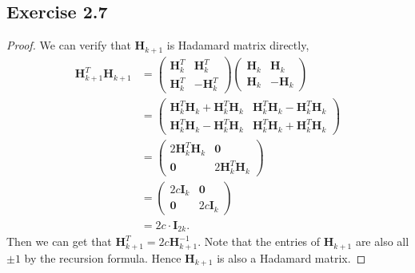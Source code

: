 \documentclass{article}
\begin{document}
\subsection{Exercise 2.7}
    \begin{proof}
    We can verify that $\bm{H}_{k+1}$ is Hadamard matrix directly,
    $$
    \begin{aligned}
    \bm{H}_{k+1}^{T} \bm{H}_{k+1} & = \left(\begin{array}{cc}
        \bm{H}_{k}^T &  \bm{H}_{k}^T\\
         \bm{H}_{k}^T& -\bm{H}_{k}^T
    \end{array}\right)  \left(\begin{array}{cc}
        \bm{H}_{k} &  \bm{H}_{k}\\
         \bm{H}_{k} & -\bm{H}_{k}
    \end{array}\right)\\
    &= \left(\begin{array}{cc}
         \bm{H}_{k}^T \bm{H}_{k} + \bm{H}_{k}^T\bm{H}_{k}& \bm{H}_{k}^T \bm{H}_{k}-\bm{H}_{k}^T \bm{H}_{k} \\
         \bm{H}_{k}^T \bm{H}_{k} - \bm{H}_{k}^T \bm{H}_{k}& \bm{H}_{k}^T \bm{H}_{k}+\bm{H}_{k}^T \bm{H}_{k} 
    \end{array}\right) \\
    &= \left( \begin{array}{cc}
         2\bm{H}_{k}^T \bm{H}_k& \bm{0} \\
         \bm{0}& 2\bm{H}_{k}^T \bm{H}_k 
    \end{array} \right) \\
    &= \left( \begin{array}{cc}
         2c\bm{I}_k & \bm{0} \\
         \bm{0}& 2c\bm{I}_k 
    \end{array} \right) \\
    &= 2c \cdot \bm{I}_{2k}.
    \end{aligned}
    $$
    Then we can get that $\bm{H}_{k+1}^{T} = 2c \bm{H}_{k+1}^{-1}$. Note that the entries of $\bm{H}_{k+1}$ are also all $\pm 1$ by the recursion formula. Hence $\bm{H}_{k+1}$ is also a Hadamard matrix.
    \end{proof}
\end{document}
